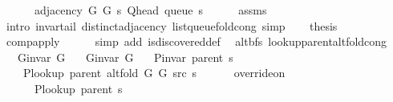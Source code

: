 \begin{isabellebody}
\ \ \ \ \ \ {\isacharparenleft}{\kern0pt}adjacency\ G{}\ G{}\ s\ {\isacharparenleft}{\kern0pt}Q{\isacharunderscore}{\kern0pt}head\ {\isacharparenleft}{\kern0pt}queue\ s{\isacharparenright}{\kern0pt}{\isacharparenright}{\kern0pt}{\isacharparenright}{\kern0pt}{\isachardoublequoteclose}\isanewline
\ \ \ \ \isamarkupfalse%
\ assms\isanewline
\ \ \ \ \isamarkupfalse%
\ {\isacharparenleft}{\kern0pt}intro\ invar{\isacharunderscore}{\kern0pt}tail\ distinct{\isacharunderscore}{\kern0pt}adjacency\ list{\isacharunderscore}{\kern0pt}queue{\isacharunderscore}{\kern0pt}fold{\isacharunderscore}{\kern0pt}cong{\isacharparenright}{\kern0pt}\ simp{\isacharplus}{\kern0pt}\isanewline
\ \ \isamarkupfalse%
\ {\isacharquery}{\kern0pt}thesis\isanewline
\ \ \ \ \isamarkupfalse%
\ comp{\isacharunderscore}{\kern0pt}apply\isanewline
\ \ \ \ \isamarkupfalse%
\ {\isacharparenleft}{\kern0pt}simp\ add{\isacharcolon}{\kern0pt}\ is{\isacharunderscore}{\kern0pt}discovered{\isacharunderscore}{\kern0pt}def{\isacharparenright}{\kern0pt}\isanewline
{}\isamarkupfalse%
%
\endisatagproof
{\isafoldproof}%
%
\isadelimproof
\isanewline
%
\endisadelimproof
\isanewline
{}\isamarkupfalse%
\ {\isacharparenleft}{\kern0pt}\ alt{\isacharunderscore}{\kern0pt}bfs{\isacharparenright}{\kern0pt}\ lookup{\isacharunderscore}{\kern0pt}parent{\isacharunderscore}{\kern0pt}alt{\isacharunderscore}{\kern0pt}fold{\isacharunderscore}{\kern0pt}cong{\isacharcolon}{\kern0pt}\isanewline
\ \ \ {\isachardoublequoteopen}G{\isachardot}{\kern0pt}invar\ G{}{\isachardoublequoteclose}\isanewline
\ \ \ {\isachardoublequoteopen}G{\isachardot}{\kern0pt}invar\ G{}{\isachardoublequoteclose}\isanewline
\ \ \ {\isachardoublequoteopen}P{\isacharunderscore}{\kern0pt}invar\ {\isacharparenleft}{\kern0pt}parent\ s{\isacharparenright}{\kern0pt}{\isachardoublequoteclose}\isanewline
\ \ \isanewline
\ \ \ \ {\isachardoublequoteopen}P{\isacharunderscore}{\kern0pt}lookup\ {\isacharparenleft}{\kern0pt}parent\ {\isacharparenleft}{\kern0pt}alt{\isacharunderscore}{\kern0pt}fold\ G{}\ G{}\ src\ s{\isacharparenright}{\kern0pt}{\isacharparenright}{\kern0pt}\ {\isacharequal}{\kern0pt}\isanewline
\ \ \ \ \ override{\isacharunderscore}{\kern0pt}on\isanewline
\ \ \ \ \ \ {\isacharparenleft}{\kern0pt}P{\isacharunderscore}{\kern0pt}lookup\ {\isacharparenleft}{\kern0pt}parent\ s{\isacharparenright}{\kern0pt}{\isacharparenright}{\kern0pt}\isanewline

\end{isabellebody}
